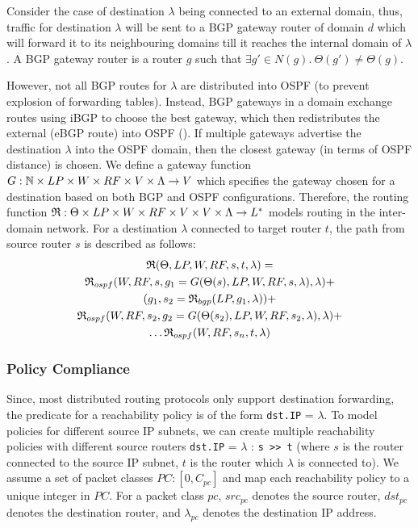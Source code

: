 Consider the case of destination $\lambda$ being connected 
to an external domain, thus, traffic for destination $\lambda$
will be sent to a BGP gateway router of domain $d$ which 
will forward it to its neighbouring domains till
it reaches the internal domain of $\lambda$. A BGP gateway
router is a router $g$ such that $\exists g' \in N(g). 
~\Theta(g') \not= \Theta(g)$. 

However, not all BGP routes for $\lambda$
are distributed 
into OSPF (to prevent explosion of forwarding tables). Instead,
BGP gateways in a domain exchange routes using iBGP to choose
the best gateway, which then redistributes the external
(eBGP route) into OSPF (). If multiple
gateways advertise the destination $\lambda$ into the OSPF 
domain, then the closest gateway (in terms of OSPF distance)
is chosen. We define a gateway function $G: \mathbb{N} \times LP \times
W \times RF \times V \times \Lambda \rightarrow V$ which specifies
the gateway chosen for a destination based on both BGP and OSPF
configurations. Therefore, the routing function 
$\mathfrak{R}:\Theta \times LP \times W \times RF \times V \times V \times \Lambda \rightarrow L^*$ models routing in the inter-domain network. 
For a destination $\lambda$ connected to target router $t$, the 
path from source router $s$ is described as follows:
\begin{multline}
	\mathfrak{R}(\Theta, LP, W, RF, s, t, \lambda) = \\
	\mathfrak{R}_{ospf}(W,RF,s,g_1=G(\Theta(s),LP,W,RF,s,\lambda), \lambda) + \\
	 (g_1, s_2=\mathfrak{R}_{bgp}(LP, g_1, \lambda))+ \\
	\mathfrak{R}_{ospf}(W,RF,s_2,g_2=G(\Theta(s_2),LP,W,RF,s_2,\lambda), \lambda) + \\
	\ldots \mathfrak{R}_{ospf}(W,RF,s_n,t,\lambda)
\end{multline}

\subsubsection{Policy Compliance}
Since, most distributed routing protocols only support
destination forwarding, the predicate for a reachability
policy is of the form \texttt{dst.IP} = $\lambda$. To 
model policies for different source IP subnets, we can create
multiple reachability policies with different source routers
\texttt{dst.IP} = $\lambda$ : \texttt{s >> t} (where $s$ is
the router connected to the source IP subnet, $t$ is the router
which $\lambda$ is connected to).
We assume a set of packet classes $PC : [0,C_{pc}]$ 
and map each reachability policy to a unique integer in $PC$.
For a packet class $pc$, $src_{pc}$ denotes the source router,
$dst_{pc}$ denotes the destination router, and $\lambda_{pc}$
denotes the destination IP address. 

